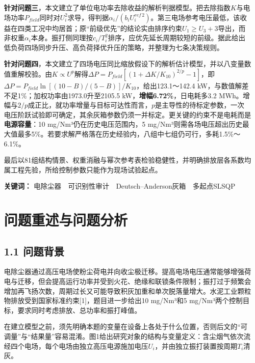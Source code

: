 \documentclass[UTF8,zihao=5,a4paper]{ctexart}
\begin{document}
\textbf{针对问题三}，本文建立了单位电功率去除收益的解析判据模型。把去除指数$K$与电场功率$P_{field}$同时对$U_i^{2}$求导，得判据$\alpha_i/(b_iU_{i}^{ref\,2})$。第三电场参考电压最低，该收益在四类工况中均居首；原“前级优先”的结论实由排序约束$U_1\ge U_3+3$导出，而非权重$\alpha_i$本身。振打侧同理按$c_i/T_i^{2}$排序，应优先延长周期较短的前级。据此给出低负荷四场同步升压、高负荷择优升压的策略，并整理为七条决策规则。

\textbf{针对问题四}，本文建立了四场电压同比缩放假设下的解析估计模型，并以八变量数值重解校验。由$K\propto U^{p}$解得$\Delta P=P_{field}[(1+\Delta K/K_{10})^{2/p}-1]$，即$\Delta P=P_{field}\ln[(10-B)/(5-B)]/K_{10}$，给出123.1～142.4 kW，与数值解差不足1\%；加权功率由1973.0升至2105.5 kW，\textbf{增幅6.72\%}，日电耗多3.2 MWh。增幅与$2/p$成正比，就功率增量与目标可达性而言，$p$是主导性的待标定参数，一次电压阶跃试验即可确定，其余灰箱参数仍须一并标定。更关键的约束不是电耗而是\textbf{电源容量}：10 mg/Nm³仍在历史电压范围内，5 mg/Nm³则需各场电压超出历史最大值最多5\%。若要求解严格落在历史经验内，八组中七组仍可行，多耗1.5\%～6.1\%。

最后以81组结构情景、权重消融与幂次参考表检验稳健性，并明确排放层各系数均属工程先验，所给控制参数只能作为现场试验起点。

\vspace{8pt}

\noindent \textbf{关键词：} 电除尘器　可识别性审计　Deutsch–Anderson灰箱　多起点SLSQP
\clearpage

\section{问题重述与问题分析}

\subsection*{1.1 问题背景}

电除尘器通过高压电场使粉尘荷电并向收尘极迁移。提高电场电压通常能够增强荷电与迁移，但会提高运行功率并受到火花、绝缘和联锁条件限制；振打过于频繁会增加再飞扬次数，周期过长又可能导致积灰加重和单次脱落量增大。水泥工业颗粒物排放受到国家标准约束[1]，题目进一步给出10 mg/Nm³和5 mg/Nm³两个控制目标，要求同时考虑排放、总功率和振打峰值。

在建立模型之前，须先明确本题的变量在设备上各处于什么位置，否则后文的“可调量”与“结果量”容易混淆。图1给出研究对象的结构与变量定义：含尘烟气依次流经四个电场，每个电场由独立高压电源施加电压$U_i$，并由独立振打装置按周期$T_i$清灰。
\end{document}
